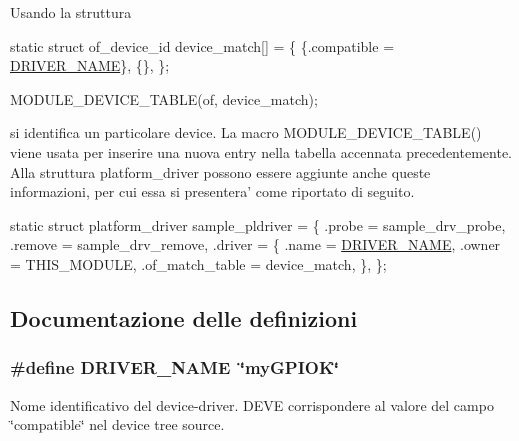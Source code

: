 Usando la struttura


\begin{DoxyCode}
\textcolor{keyword}{static} \textcolor{keyword}{struct }of\_device\_id device\_match[] = \{
        \{.compatible = \hyperlink{group___linux-_driver_ga25634d21648ca7fb7a2aca614bafaaeb}{DRIVER\_NAME}\},
        \{\},
\};

MODULE\_DEVICE\_TABLE(of, device\_match);
\end{DoxyCode}


si identifica un particolare device. La macro M\+O\+D\+U\+L\+E\+\_\+\+D\+E\+V\+I\+C\+E\+\_\+\+T\+A\+B\+L\+E() viene usata per inserire una nuova entry nella tabella accennata precedentemente. Alla struttura platform\+\_\+driver possono essere aggiunte anche queste informazioni, per cui essa si presentera' come riportato di seguito.


\begin{DoxyCode}
\textcolor{keyword}{static} \textcolor{keyword}{struct }platform\_driver sample\_pldriver = \{
    .probe  = sample\_drv\_probe,
    .remove = sample\_drv\_remove,
    .driver = \{
        .name  = \hyperlink{group___linux-_driver_ga25634d21648ca7fb7a2aca614bafaaeb}{DRIVER\_NAME},
        .owner = THIS\_MODULE,
        .of\_match\_table = device\_match,
    \},
\};
\end{DoxyCode}
 

\subsection{Documentazione delle definizioni}
\hypertarget{group___linux-_driver_ga25634d21648ca7fb7a2aca614bafaaeb}{
\subsubsection[{D\+R\+I\+V\+E\+R\+\_\+\+N\+A\+M\+E}]{\setlength{\rightskip}{0pt plus 5cm}\#define D\+R\+I\+V\+E\+R\+\_\+\+N\+A\+M\+E~\char`\"{}my\+G\+P\+I\+O\+K\char`\"{}}}\label{group___linux-_driver_ga25634d21648ca7fb7a2aca614bafaaeb}


Nome identificativo del device-\/driver. D\+E\+V\+E corrispondere al valore del campo \char`\"{}compatible\char`\"{} nel device tree source. 

